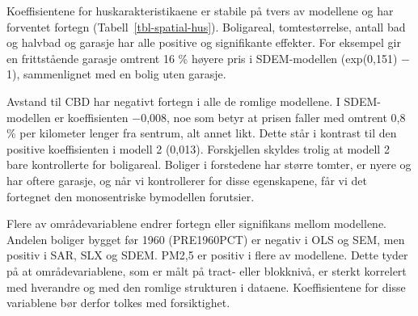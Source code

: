 \documentclass[
  norsk,
  a4paper,
]{article}
\begin{document}
Koeffisientene for huskarakteristikaene er stabile på tvers av modellene
og har forventet fortegn (Tabell~\ref{tbl-spatial-hus}). Boligareal,
tomtestørrelse, antall bad og halvbad og garasje har alle positive og
signifikante effekter. For eksempel gir en frittstående garasje omtrent
16 \% høyere pris i SDEM-modellen (exp(0,151) − 1), sammenlignet med en
bolig uten garasje.

Avstand til CBD har negativt fortegn i alle de romlige modellene. I
SDEM-modellen er koeffisienten −0,008, noe som betyr at prisen faller
med omtrent 0,8 \% per kilometer lenger fra sentrum, alt annet likt.
Dette står i kontrast til den positive koeffisienten i modell 2 (0,013).
Forskjellen skyldes trolig at modell 2 bare kontrollerte for boligareal.
Boliger i forstedene har større tomter, er nyere og har oftere garasje,
og når vi kontrollerer for disse egenskapene, får vi det fortegnet den
monosentriske bymodellen forutsier.

Flere av områdevariablene endrer fortegn eller signifikans mellom
modellene. Andelen boliger bygget før 1960 (PRE1960PCT) er negativ i OLS
og SEM, men positiv i SAR, SLX og SDEM. PM2,5 er positiv i flere av
modellene. Dette tyder på at områdevariablene, som er målt på tract-
eller blokknivå, er sterkt korrelert med hverandre og med den romlige
strukturen i dataene. Koeffisientene for disse variablene bør derfor
tolkes med forsiktighet.
\end{document}
